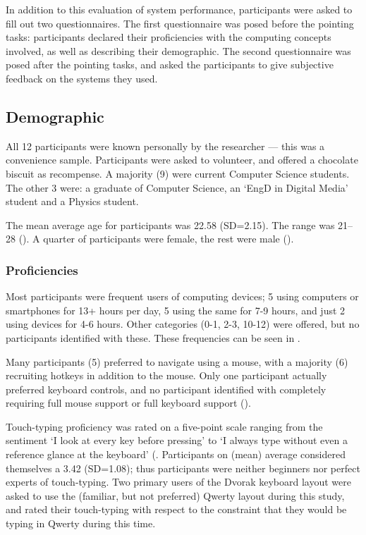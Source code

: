 \documentclass[11pt,openright,a4paper]{report}
\begin{document}
In addition to this evaluation of system performance, participants were asked to fill out two questionnaires. The first questionnaire was posed before the pointing tasks: participants declared their proficiencies with the computing concepts involved, as well as describing their demographic. The second questionnaire was posed after the pointing tasks, and asked the participants to give subjective feedback on the systems they used.

\subsection{Demographic}
All 12 participants were known personally by the researcher --- this was a convenience sample. Participants were asked to volunteer, and offered a chocolate biscuit as recompense. A majority (9) were current Computer Science students. The other 3 were: a graduate of Computer Science, an `EngD in Digital Media' student and a Physics student.

The mean average age for participants was 22.58 (SD=2.15). The range was 21--28 ().
A quarter of participants were female, the rest were male ().

\subsubsection{Proficiencies}
Most participants were frequent users of computing devices; 5 using computers or smartphones for 13+ hours per day, 5 using the same for 7-9 hours, and just 2 using devices for 4-6 hours. Other categories (0-1, 2-3, 10-12) were offered, but no participants identified with these. These frequencies can be seen in .

Many participants (5) preferred to navigate using a mouse, with a majority (6) recruiting hotkeys in addition to the mouse. Only one participant actually preferred keyboard controls, and no participant identified with completely requiring full mouse support or full keyboard support ().

Touch-typing proficiency was rated on a five-point scale ranging from the sentiment `I look at every key before pressing' to `I always type without even a reference glance at the keyboard' (. Participants on (mean) average considered themselves a 3.42 (SD=1.08); thus participants were neither beginners nor perfect experts of touch-typing. Two primary users of the Dvorak keyboard layout were asked to use the (familiar, but not preferred) Qwerty layout during this study, and rated their touch-typing with respect to the constraint that they would be typing in Qwerty during this time.
\end{document}
